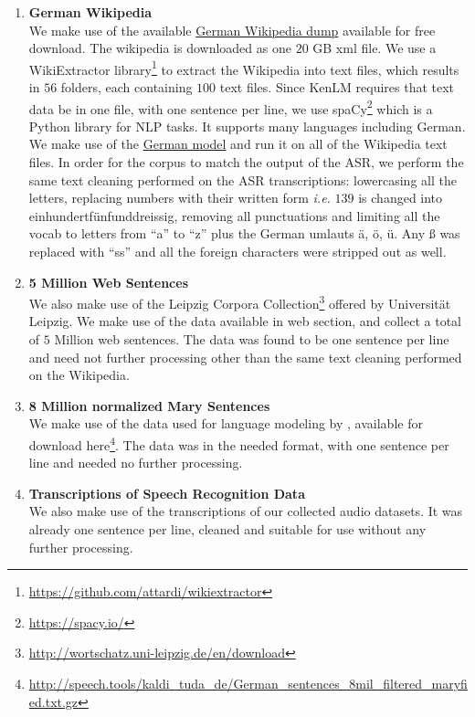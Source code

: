 \begin{enumerate}
	\item \textbf{German Wikipedia} \\
	We make use of the available \href{https://dumps.wikimedia.org/dewiki/latest/}{German Wikipedia dump} available for free download. The wikipedia is downloaded as one $20$ GB xml file. We use a WikiExtractor library\footnote{\url{https://github.com/attardi/wikiextractor}} to extract the Wikipedia into text files, which results in $56$ folders, each containing $100$ text files. Since KenLM requires that text data be in one file, with one sentence per line, we use spaCy\footnote{\url{https://spacy.io/}} which is a Python library for \ac{NLP} tasks. It supports many languages including German. We make use of the \href{https://spacy.io/models/de}{German model} and run it on all of the Wikipedia text files. In order for the corpus to match the output of the \ac{ASR}, we perform the same text cleaning performed on the \ac{ASR} transcriptions: lowercasing all the letters, replacing numbers with their written form \textit{i.e.} $139$ is changed into einhundertf{\"u}nfunddreissig, removing all punctuations and limiting all the vocab to letters from \enquote{a} to \enquote{z} plus the German umlauts {\"a}, {\"o}, {\"u}. Any {\ss} was replaced with \enquote{ss} and all the foreign characters were stripped out as well.
	
	
	
	\item \textbf{5 Million Web Sentences} \\
	We also make use of the Leipzig Corpora Collection\footnote{\url{http://wortschatz.uni-leipzig.de/en/download}} offered by Universit{\"a}t Leipzig. We make use of the data available in web section, and collect a total of $5$ Million web sentences. The data was found to be one sentence per line and need not further processing other than the same text cleaning performed on the Wikipedia.
	
	
	\item \textbf{8 Million normalized Mary Sentences} \\
	We make use of the data used for language modeling by \cite{milde2018open}, available for download here\footnote{\url{ http://speech.tools/kaldi_tuda_de/German_sentences_8mil_filtered_maryfied.txt.gz}}. The data was in the needed format, with one sentence per line and needed no further processing.
	
	
	\item \textbf{Transcriptions of Speech Recognition Data} \\
	We also make use of the transcriptions of our collected audio datasets. It was already one sentence per line, cleaned and suitable for use without any further processing.

	
\end{enumerate}


